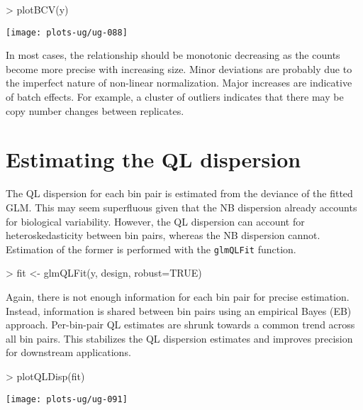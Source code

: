 \documentclass[12pt]{report}
\renewenvironment{Schunk}{\vspace{0pt}}{\vspace{0pt}}
\newcommand{\code}[1]{{\small\texttt{#1}}}
\begin{document}
\begin{Schunk}
\begin{Sinput}
> plotBCV(y)
\end{Sinput}
\end{Schunk}

\begin{center}
\texttt{[image: plots-ug/ug-088]}
\end{center}

In most cases, the relationship should be monotonic decreasing as the counts become more precise with increasing size.
Minor deviations are probably due to the imperfect nature of non-linear normalization.
Major increases are indicative of batch effects.
For example, a cluster of outliers indicates that there may be copy number changes between replicates.

\section{Estimating the QL dispersion}
The QL dispersion for each bin pair is estimated from the deviance of the fitted GLM.
This may seem superfluous given that the NB dispersion already accounts for biological variability.
However, the QL dispersion can account for heteroskedasticity between bin pairs, whereas the NB dispersion cannot.
Estimation of the former is performed with the \code{glmQLFit} function.

\begin{Schunk}
\begin{Sinput}
> fit <- glmQLFit(y, design, robust=TRUE)
\end{Sinput}
\end{Schunk}

Again, there is not enough information for each bin pair for precise estimation.
Instead, information is shared between bin pairs using an empirical Bayes (EB) approach.
Per-bin-pair QL estimates are shrunk towards a common trend across all bin pairs.
This stabilizes the QL dispersion estimates and improves precision for downstream applications.

\begin{Schunk}
\begin{Sinput}
> plotQLDisp(fit)
\end{Sinput}
\end{Schunk}

\begin{center}
\texttt{[image: plots-ug/ug-091]}
\end{center}
\end{document}
